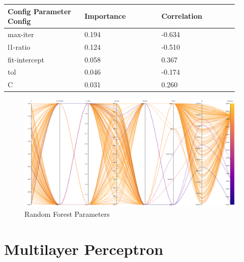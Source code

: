 \documentclass[11pt]{article}
\begin{document}
  \begin{table}[ht]
    \centering
    \begin{tabular}{|p{0.3\linewidth} | p{0.3\linewidth}| p{0.3\linewidth}|} 
      \hline
      \textbf{Config Parameter Config}  & \textbf{Importance} & \textbf{Correlation} \\ \hline
      max-iter & 0.194 & -0.634 \\ \hline
      l1-ratio & 0.124 & -0.510 \\ \hline
      fit-intercept & 0.058 & 0.367 \\ \hline
      tol & 0.046 & -0.174 \\ \hline
      C & 0.031 & 0.260 \\ \hline
    \end{tabular}
  \end{table}\label{LC_ParamImp2}

\begin{figure}[h]
    \caption {Random Forest Parameters} \label{ParallelCoordLC}
    \centering 
    \includegraphics[width = \textwidth, height = \textwidth, keepaspectratio]{Images/LC ParallelCoordGraph.png}
\end{figure}

  \FloatBarrier
\newpage
\section{Multilayer Perceptron}
\end{document}
